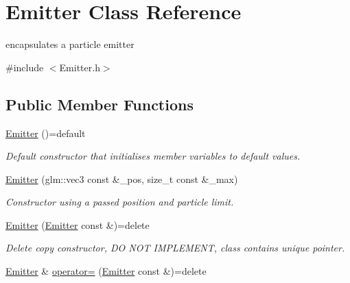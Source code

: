 \hypertarget{classEmitter}{\section{Emitter Class Reference}
\label{classEmitter}
}


encapsulates a particle emitter  




{\ttfamily \#include $<$Emitter.\-h$>$}

\subsection*{Public Member Functions}
\begin{DoxyCompactItemize}
\item 
\hypertarget{classEmitter_ab3e306b6807f4113b77e0f0dc402f8ee}{\hyperlink{classEmitter_ab3e306b6807f4113b77e0f0dc402f8ee}{Emitter} ()=default}\label{classEmitter_ab3e306b6807f4113b77e0f0dc402f8ee}

\begin{DoxyCompactList}\small\item\em Default constructor that initialises member variables to default values. \end{DoxyCompactList}\item 
\hyperlink{classEmitter_a441e3b9302f39f0d359773e5ed72afb7}{Emitter} (glm\-::vec3 const \&\-\_\-pos, size\-\_\-t const \&\-\_\-max)
\begin{DoxyCompactList}\small\item\em Constructor using a passed position and particle limit. \end{DoxyCompactList}\item 
\hypertarget{classEmitter_abe9a91a6a709a244ec17c9f8284c279e}{\hyperlink{classEmitter_abe9a91a6a709a244ec17c9f8284c279e}{Emitter} (\hyperlink{classEmitter}{Emitter} const \&)=delete}\label{classEmitter_abe9a91a6a709a244ec17c9f8284c279e}

\begin{DoxyCompactList}\small\item\em Delete copy constructor, D\-O N\-O\-T I\-M\-P\-L\-E\-M\-E\-N\-T, class contains unique pointer. \end{DoxyCompactList}\item 
\hypertarget{classEmitter_a9c2eef3cc2d4909b4f8053abc2a66505}{\hyperlink{classEmitter}{Emitter} \& \hyperlink{classEmitter_a9c2eef3cc2d4909b4f8053abc2a66505}{operator=} (\hyperlink{classEmitter}{Emitter} const \&)=delete}\label{classEmitter_a9c2eef3cc2d4909b4f8053abc2a66505}


\end{DoxyCompactItemize}
